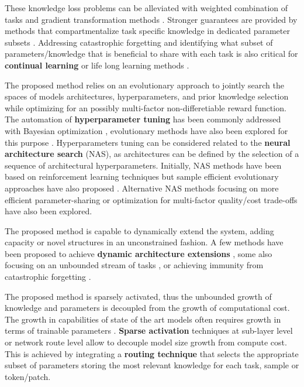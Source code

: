 \documentclass{article} \usepackage{iclr2023_conference,times}
\begin{document}
These knowledge loss problems can be alleviated with weighted combination of tasks \citep{Liu2019LossBalancedTW,Sun2020ERNIE2A} and gradient transformation methods \citep{Chen2018GradNormGN,Sener2018MultiTaskLA,Kendall2018MultitaskLU}.
Stronger guarantees are provided by methods that compartmentalize task specific knowledge in dedicated parameter subsets \citep{Rebuffi2017LearningMV,Houlsby2019ParameterEfficientTL,Rusu2016ProgressiveNN,Rosenfeld2020IncrementalLT}.
Addressing catastrophic forgetting and identifying what subset of parameters/knowledge that is beneficial to share with each task is also critical for \textbf{continual learning} or life long learning methods
\citep{McCloskey1989CatastrophicII,French1999CatastrophicFI,Ramesh2022ModelZA}.

The proposed method relies on an evolutionary approach to jointly search the spaces of models architectures, hyperparameters, and prior knowledge selection while optimizing for an possibly multi-factor non-differetiable reward function.
The automation of \textbf{hyperparameter tuning} has been commonly addressed with Bayesian optimization \citep{Srinivas2010GaussianPO,Bergstra2011AlgorithmsFH,Snoek2012PracticalBO},
evolutionary methods have also been explored for this purpose
\citep{Jaderberg2017PopulationBT,Zhang2011EvolutionaryCM}.
Hyperparameters tuning can be considered related to the \textbf{neural architecture search} (NAS), as architectures can be defined by the selection of a sequence
of architectural hyperparameters.
Initially, NAS methods have been based on reinforcement learning techniques
\citep{Zoph2017NeuralAS} but sample efficient evolutionary approaches have also proposed \citep{Real2019RegularizedEF,Maziarz2018EvolutionaryNeuralHA}.
Alternative NAS methods focusing on more efficient parameter-sharing  \citep{Pham2018EfficientNA,Liu2019DARTSDA,Kokiopoulou2019FastTA}
or optimization for multi-factor quality/cost trade-offs \citep{Tan2019MnasNetPN} have also been explored.

The proposed method is capable to dynamically extend the system, adding capacity or novel structures in an unconstrained fashion.
A few methods have been proposed to achieve \textbf{dynamic architecture extensions} \citep{Chen2016Net2NetAL,Cai2018EfficientAS}, some also focusing on an unbounded stream of tasks \citep{Yoon2018LifelongLW,Yao2020OnlineSM}, or achieving immunity from catastrophic forgetting  \citep{Rusu2016ProgressiveNN,Li2018LearningWF,Li2019LearnTG,Rosenfeld2020IncrementalLT}.

The proposed method is sparsely activated, thus the unbounded growth of knowledge and parameters is decoupled from the growth of computational cost.
The growth in capabilities of state of the art models often requires growth in terms of trainable parameters \citep{Kaplan2020ScalingLF}.
\textbf{Sparse activation} techniques at sub-layer level \citep{Shazeer2017OutrageouslyLN,Du2021GLaMES} or network route level \citep{Fernando2017PathNetEC} allow to decouple model size growth from compute cost.
This is achieved by integrating a \textbf{routing technique} that selects the appropriate subset of parameters storing the most relevant knowledge for each task, sample or token/patch.
\end{document}
